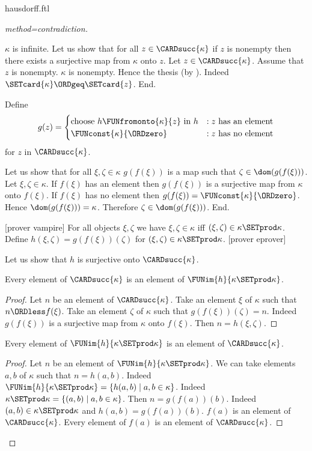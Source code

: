 \documentclass{stex}
\begin{document}
\begin{smodule}{hausdorff.ftl}
\begin{forthel}
\begin{proof}[method=contradiction]
\begin{case}{$\kappa$ is infinite.}
      Let us show that for all $z \in \CARDsucc{\kappa}$ if $z$ is nonempty then there exists a surjective map from $\kappa$ onto $z$.
        Let $z \in \CARDsucc{\kappa}$.
        Assume that $z$ is nonempty.
        $\kappa$ is nonempty.
        Hence the thesis (by ).
        Indeed $\SETcard{\kappa} \ORDgeq \SETcard{z}$.
      End.
  
      Define \[ g(z) =
        \begin{cases}
          \text{choose $h \FUNfromonto{\kappa}{z}$ in $h$}
          & : \text{$z$ has an element}
          \\
          \text{$\FUNconst{\kappa}{\ORDzero}$}
          & : \text{$z$ has no element}
        \end{cases}
      \] for $z$ in $\CARDsucc{\kappa}$.
  
      Let us show that for all $\xi, \zeta \in \kappa$ $g(f(\xi))$ is a map such that $\zeta \in \dom(g(f(\xi)))$.
        Let $\xi, \zeta \in \kappa$.
        If $f(\xi)$ has an element then $g(f(\xi))$ is a surjective map from $\kappa$ onto $f(\xi)$.
        If $f(\xi)$ has no element then $g(f(\xi)) = \FUNconst{\kappa}{\ORDzero}$.
        Hence $\dom(g(f(\xi))) = \kappa$.
        Therefore $\zeta \in \dom(g(f(\xi)))$.
      End.
  
      [prover vampire]
      For all objects $\xi, \zeta$ we have $\xi, \zeta \in \kappa$ iff $(\xi, \zeta) \in \kappa \SETprod \kappa$.
      Define $h(\xi,\zeta) = g(f(\xi))(\zeta)$ for $(\xi,\zeta) \in \kappa \SETprod \kappa$.
      [prover eprover]

      Let us show that $h$ is surjective onto $\CARDsucc{\kappa}$.
  
        Every element of $\CARDsucc{\kappa}$ is an element of $\FUNim{h}{\kappa \SETprod \kappa}$.
        \begin{proof}
          Let $n$ be an element of $\CARDsucc{\kappa}$.
          Take an element $\xi$ of $\kappa$ such that $n \ORDless f(\xi)$.
          Take an element $\zeta$ of $\kappa$ such that $g(f(\xi))(\zeta) = n$.
          Indeed $g(f(\xi))$ is a surjective map from $\kappa$ onto $f(\xi)$.
          Then $n = h(\xi,\zeta)$.
        \end{proof}
  
        Every element of $\FUNim{h}{\kappa \SETprod \kappa}$ is an element of $\CARDsucc{\kappa}$.
        \begin{proof}
          Let $n$ be an element of $\FUNim{h}{\kappa \SETprod \kappa}$.
          We can take elements $a, b$ of $\kappa$ such that $n = h(a,b)$.
          Indeed $\FUNim{h}{\kappa \SETprod \kappa} = \{h(a,b) \mid a,b \in \kappa\}$.
          Indeed $\kappa \SETprod \kappa = \{(a,b) \mid a,b \in \kappa\}$.
          Then $n = g(f(a))(b)$.
          Indeed $(a,b) \in \kappa \SETprod \kappa$ and $h(a,b) = g(f(a))(b)$.
          $f(a)$ is an element of $\CARDsucc{\kappa}$.
          Every element of $f(a)$ is an element of $\CARDsucc{\kappa}$.
  

\end{proof}
\end{case}
\end{proof}
\end{forthel}
\end{smodule}
\end{document}
